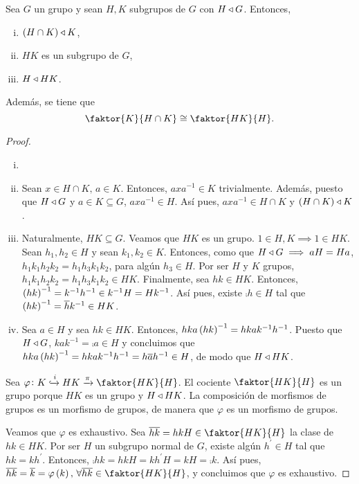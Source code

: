 \begin{teo}\label{teo:dos_iso}
    Sea $G$ un grupo y sean $H,K$ subgrupos de $G$ con $H\triangleleft G$. Entonces,
    \begin{enumerate}[i)]
        \item $\left( H\cap K\right)\triangleleft K$,
        \item $HK$ es un subgrupo de $G$,
        \item $H\triangleleft HK$.
    \end{enumerate}
    Además, se tiene que
    \[
        \faktor{K}{H\cap K}\cong\faktor{HK}{H}.
    \]
\end{teo}
\begin{proof}
    \begin{enumerate}[i)]
        \item[]
        \item Sean $x\in H\cap K,\, a\in K$. Entonces, $axa^{-1}\in K$ trivialmente. Además, puesto que $H\triangleleft G$ y $a\in K\subseteq G$, $axa^{-1}\in H$. Así pues, $axa^{-1}\in H\cap K$ y $\left( H\cap K\right)\triangleleft K$.
        \item Naturalmente, $HK\subseteq G$. Veamos que $HK$ es un grupo. $1\in H, K\implies 1\in HK$. Sean $h_1,h_2\in H$ y sean $k_1,k_2\in K$. Entonces, como que $H\triangleleft G\implies aH=Ha$, $h_1k_1h_2k_2=h_1h_3k_1k_2$, para algún $h_3\in H$. Por ser $H$ y $K$ grupos, $h_1k_1h_2k_2=h_1h_3k_1k_2\in HK$. Finalmente, sea $hk\in HK$. Entonces, $\left( hk\right) ^{-1} = k^{-1}h^{-1}\in k^{-1}H=Hk^{-1}$. Así pues, existe $\comp{h}\in H$ tal que $\left( hk\right)^{-1} = \overline{h}k^{-1}\in HK$.
        \item Sea $a\in H$ y sea $hk\in HK$. Entonces, $hka\left( hk\right) ^{-1} = hkak^{-1}h^{-1}$. Puesto que $H\triangleleft G$, $kak^{-1}=\comp{a}\in H$ y concluimos que $hka\left( hk\right) ^{-1} = hkak^{-1}h^{-1} = h\overline{a}h^{-1}\in H$, de modo que $H\triangleleft HK$.
    \end{enumerate}
    \noindent Sea $\varphi\colon K\xhookrightarrow{i} HK \xrightarrow{\pi} \faktor{HK}{H}$. El cociente $\faktor{HK}{H}$ es un grupo porque $HK$ es un grupo y $H\triangleleft HK$. La composición de morfismos de grupos es un morfismo de grupos, de manera que $\varphi$ es un morfismo de grupos.
    
    \noindent Veamos que $\varphi$ es exhaustivo. Sea $\comp{hk}=hkH\in\faktor{HK}{H}$ la clase de $hk\in HK$. Por ser $H$ un subgrupo normal de $G$, existe algún $h^{\prime}\in H$ tal que $hk=kh^{\prime}$. Entonces, $\comp{hk}=hkH=kh^{\prime}H=kH=\comp{k}$. Así pues, $\comp{hk}=\comp{k}=\varphi\lp k\rp,\,\forall\comp{hk}\in\faktor{HK}{H}$, y concluimos que $\varphi$ es exhaustivo.
    

\end{proof}

